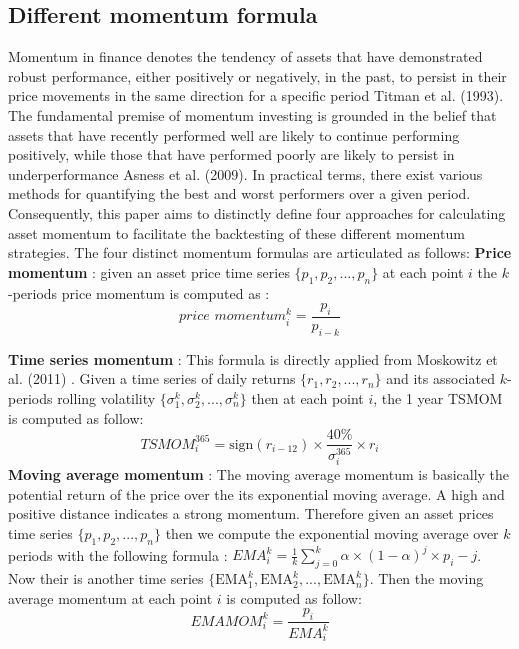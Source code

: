 \documentclass{article}
\begin{document}
\subsection{Different momentum formula}\label{subsec:momentumformulas}
Momentum in finance denotes the tendency of assets that have demonstrated robust performance, either positively or negatively, in the past, to persist in their price movements in the same direction for a specific period Titman et al. (1993)\cite{Titman1993}. The fundamental premise of momentum investing is grounded in the belief that assets that have recently performed well are likely to continue performing positively, while those that have performed poorly are likely to persist in underperformance Asness et al. (2009)\cite{Asness2009}.
\newline
In practical terms, there exist various methods for quantifying the best and worst performers over a given period. Consequently, this paper aims to distinctly define four approaches for calculating asset momentum to facilitate the backtesting of these different momentum strategies.
\newline
The four distinct momentum formulas are articulated as follows:
\newline\newline
\textbf{Price momentum} : given an asset price time series $\{p_1, p_2, ..., p_n\}$ at each point $i$ the $k$-periods price momentum is computed as : $$\textit{price momentum}^{k}_i = \frac{p_i}{p_{i-k}}$$ \newline

\textbf{Time series momentum} : This formula is directly applied from Moskowitz et al. (2011) \cite{Moskowitz2011}. Given a time series of daily returns $\{r_1, r_2, ..., r_n\}$ and its associated $k$-periods rolling volatility $\{\sigma_1^k, \sigma_2^k, ..., \sigma_n^k\}$ then at each point $i$, the 1 year TSMOM is computed as follow: $$\textit{TSMOM}^{365}_{i}=\text{sign}(r_{i-12})\times\frac{40\text{\%}}{\sigma_i^{365}}\times r_i$$ \newline
\textbf{Moving average momentum} : The moving average momentum is basically the potential return of the price over the its exponential moving average. A high and positive distance indicates a strong momentum. Therefore given an asset prices time series $\{p_1, p_2, ..., p_n\}$ then we compute the exponential moving average over $k$ periods with the following formula : $\textit{EMA}^k_i=\frac{1}{k}\sum_{j=0}^k \alpha\times(1-\alpha)^j\times p_i-j$. Now their is  another time series $\{\text{EMA}_1^k, \text{EMA}_2^k, ..., \text{EMA}_n^k\}$. Then the moving average momentum at each point $i$ is computed as follow: $$\textit{EMAMOM}^k_i=\frac{p_i}{EMA_i^k}$$\newline
\end{document}
